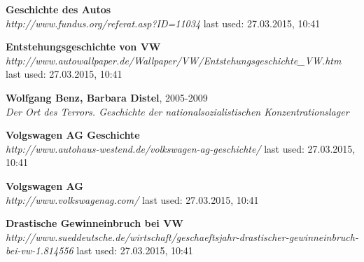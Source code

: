 \documentclass[12pt]{article}
\begin{document}
\begin{thebibliography}{56}
  \textbf{Geschichte des Autos} \\
  \textit{
  	  http://www.fundus.org/referat.asp?ID=11034
  }
  \newline last used: 27.03.2015, 10:41
    
\textbf{Entstehungsgeschichte von VW} \\
\textit{
http://www.autowallpaper.de/Wallpaper/VW/Entstehungsgeschichte\_VW.htm
}
\newline last used: 27.03.2015, 10:41

\textbf{Wolfgang Benz, Barbara Distel}, 2005-2009 \\
\textit{
Der Ort des Terrors. Geschichte der nationalsozialistischen Konzentrationslager
}


\textbf{Volgswagen AG Geschichte} \\
\textit{
http://www.autohaus-westend.de/volkswagen-ag-geschichte/
}
\newline last used: 27.03.2015, 10:41

\textbf{Volgswagen AG} \\
\textit{
http://www.volkswagenag.com/
}
\newline last used: 27.03.2015, 10:41

\textbf{Drastische Gewinneinbruch bei VW} \\
\textit{
http://www.sueddeutsche.de/wirtschaft/geschaeftsjahr-drastischer-gewinneinbruch-bei-vw-1.814556
}
\newline last used: 27.03.2015, 10:41  
  
\end{thebibliography}
\end{document}

